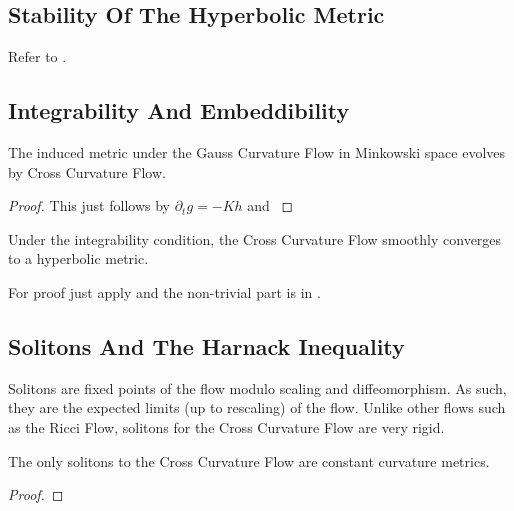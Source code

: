 \documentclass[a4paper, 12pt]{amsart}
\begin{document}
\subsection{Stability Of The Hyperbolic Metric}
\label{subsec:xcf_stability}

{\color{red} Refer to \cite{MR2448593}.}

\subsection{Integrability And Embeddibility}
\label{subsec:xcf_gcf}

\begin{lemma}
\label{lem:xcf_gcf}

The induced metric under the Gauss Curvature Flow in Minkowski space evolves by Cross Curvature Flow.
\end{lemma}

\begin{proof}
{\color{red} This just follows by \(\partial_t g = -K h\) and }
\end{proof}

\begin{thm}
\label{thm:xcf_integrable_convergence}

Under the integrability condition, the Cross Curvature Flow smoothly converges to a hyperbolic metric.
\end{thm}

{\color{red}For proof just apply  and the non-trivial part is in \cite{MR3344442}.}

\subsection{Solitons And The Harnack Inequality}
\label{subsec:xcf_solitons}

Solitons are fixed points of the flow modulo scaling and diffeomorphism. As such, they are the expected limits (up to rescaling) of the flow. Unlike other flows such as the Ricci Flow, solitons for the Cross Curvature Flow are very rigid.

\begin{lemma}
The only solitons to the Cross Curvature Flow are constant curvature metrics.
\end{lemma}

\begin{proof}

\end{proof}
\end{document}

